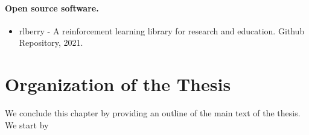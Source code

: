 \paragraph{Open source software.}

\begin{itemize}[label=]
    \item rlberry - A reinforcement learning library for research and education. Github Repository, 2021.~\citep{rlberry2021}
\end{itemize}

\section{Organization of the Thesis}\label{sec:intro.organization}

We conclude this chapter by providing an outline of the main text of the thesis. We start by 

% 
% 
